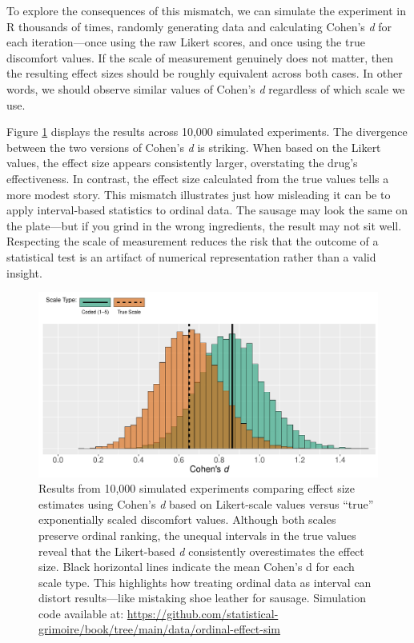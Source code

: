To explore the consequences of this mismatch, we can simulate the experiment in R thousands of times, randomly generating data and calculating Cohen’s \textit{d} for each iteration—once using the raw Likert scores, and once using the true discomfort values. If the scale of measurement genuinely does not matter, then the resulting effect sizes should be roughly equivalent across both cases. In other words, we should observe similar values of Cohen’s \textit{d} regardless of which scale we use.

Figure \ref{fig:ord_vs_int_effect} displays the results across 10,000 simulated experiments. The divergence between the two versions of Cohen’s \textit{d} is striking. When based on the Likert values, the effect size appears consistently larger, overstating the drug’s effectiveness. In contrast, the effect size calculated from the true values tells a more modest story. This mismatch illustrates just how misleading it can be to apply interval-based statistics to ordinal data. The sausage may look the same on the plate—but if you grind in the wrong ingredients, the result may not sit well. Respecting the scale of measurement reduces the risk that the outcome of a statistical test is an artifact of numerical representation rather than a valid insight.

\begin{figure}[h]
\includegraphics[width = \textwidth]{data/ordinal-effect-sim/ord_vs_int_effect.pdf}
\caption{Results from 10,000 simulated experiments comparing effect size estimates using Cohen’s \textit{d} based on Likert-scale values versus ``true'' exponentially scaled discomfort values. Although both scales preserve ordinal ranking, the unequal intervals in the true values reveal that the Likert-based \textit{d} consistently overestimates the effect size. Black horizontal lines indicate the mean Cohen’s d for each scale type. This highlights how treating ordinal data as interval can distort results—like mistaking shoe leather for sausage.
Simulation code available at: \url{https://github.com/statistical-grimoire/book/tree/main/data/ordinal-effect-sim}}
\label{fig:ord_vs_int_effect}
\end{figure}

